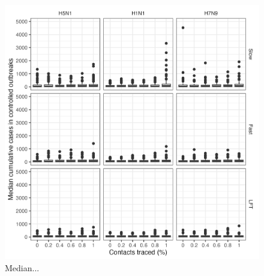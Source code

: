 \documentclass{article}
\begin{document}
\begin{figure}[ht]
\centering
\includegraphics[width=\textwidth]{../plots/median_controlled_outbreak_size.png}
\caption{Median...}
\label{fig:median-controlled-outbreak-size}
\end{figure}
\end{document}
